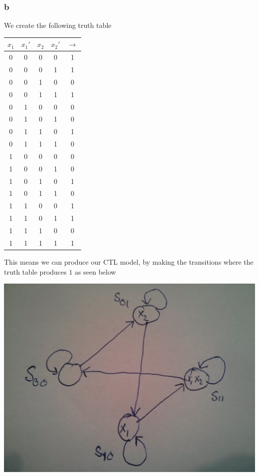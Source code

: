 \documentclass[12pt]{article}
\begin{document}
\subsubsection*{b}
We create the following truth table\\
\begin{center}
\begin{tabular}{cccc|c}
$x_1$ & $x_1'$ & $x_2$ & $x_2'$ & $\rightarrow$ \\ 
\hline 
0 & 0 & 0 & 0 & 1 \\ 
0 & 0 & 0 & 1 & 1 \\ 
0 & 0 & 1 & 0 & 0 \\ 
0 & 0 & 1 & 1 & 1 \\
\hline
0 & 1 & 0 & 0 & 0 \\ 
0 & 1 & 0 & 1 & 0 \\
0 & 1 & 1 & 0 & 1 \\
0 & 1 & 1 & 1 & 0 \\
\hline
1 & 0 & 0 & 0 & 0 \\
1 & 0 & 0 & 1 & 0 \\
1 & 0 & 1 & 0 & 1 \\
1 & 0 & 1 & 1 & 0 \\
\hline
1 & 1 & 0 & 0 & 1 \\
1 & 1 & 0 & 1 & 1 \\
1 & 1 & 1 & 0 & 0 \\
1 & 1 & 1 & 1 & 1 \\
\end{tabular}
\end{center}
This means we can produce our CTL model, by making the transitions where the truth table produces $1$ as seen below
\begin{center}
\includegraphics[scale=0.1]{8}
\end{center}
\end{document}
